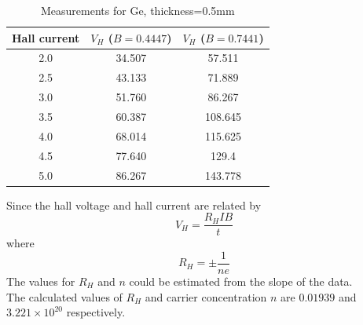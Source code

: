 \documentclass{article}
\begin{document}
	\begin{table}[h]
		\centering
		\begin{tabular}{|c|c|c|}
			\hline
			Hall current & $V_H$ ($B=0.4447$) & $V_H$ ($B=0.7441 $)\\
			\hline
			2.0 & 34.507 & 57.511\\
			2.5 & 43.133 & 71.889\\
			3.0 & 51.760 & 86.267 \\
			3.5 & 60.387 & 108.645\\
			4.0 & 68.014 & 115.625\\
			4.5 & 77.640 & 129.4 \\
			5.0 & 86.267 & 143.778\\
			\hline
		\end{tabular}
		\caption{Measurements for Ge, thickness=0.5mm}
	\end{table}
	
	
	Since the hall voltage and hall current are related by $$ V_H = \frac{R_H I B}{t} $$ where $$ R_H = \pm \frac{1}{ne}$$
	The values for $R_H$ and $n$ could be estimated from the slope of the data.\\
	
	The calculated values of $R_H$ and carrier concentration $n$ are $0.01939$ and $3.221\times 10^{20}$ respectively.\\
	
	
\end{document}
